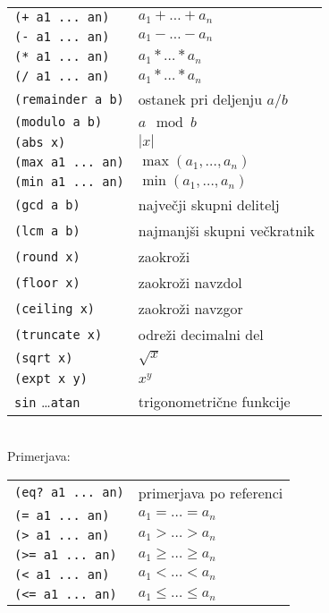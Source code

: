 \documentclass[a3paper,9pt]{extarticle}
\begin{document}
\begin{multicols}{4}
\begin{tabular}{@{}ll@{}}
    \lstinline|(+ a1 ... an)| & $a_1 + \dots + a_n$  \\
    \lstinline|(- a1 ... an)| & $a_1 - \dots - a_n$  \\
    \lstinline|(* a1 ... an)| & $a_1 * \dots * a_n$  \\
    \lstinline|(/ a1 ... an)| & $a_1 * \dots * a_n$  \\
    \lstinline|(remainder a b)| & ostanek pri deljenju $a/b$  \\
    \lstinline|(modulo a b)| & $a \mod b$  \\
    \lstinline|(abs x)| & $|x|$  \\
    \lstinline|(max a1 ... an)| & $\max(a_1, \dots, a_n)$  \\
    \lstinline|(min a1 ... an)| & $\min(a_1, \dots, a_n)$  \\
    \lstinline|(gcd a b)| & največji skupni delitelj  \\
    \lstinline|(lcm a b)| & najmanjši skupni večkratnik  \\
    \lstinline|(round x)| & zaokroži  \\
    \lstinline|(floor x)| & zaokroži navzdol  \\
    \lstinline|(ceiling x)| & zaokroži navzgor  \\
    \lstinline|(truncate x)| & odreži decimalni del  \\
    \lstinline|(sqrt x)| & $\sqrt{x}$  \\
    \lstinline|(expt x y)| & $x^y$  \\
    \lstinline|sin| \dots \lstinline|atan| & trigonometrične funkcije  \\
\end{tabular}\\

Primerjava:

\begin{tabular}{@{}ll@{}}
    \lstinline|(eq? a1 ... an)| & primerjava po referenci  \\
    \lstinline|(= a1 ... an)| & $a_1 = \dots = a_n$  \\
    \lstinline|(> a1 ... an)| & $a_1 > \dots > a_n$  \\
    \lstinline|(>= a1 ... an)| & $a_1 \geq \dots \geq a_n$  \\
    \lstinline|(< a1 ... an)| & $a_1 < \dots < a_n$  \\
    \lstinline|(<= a1 ... an)| & $a_1 \leq \dots \leq a_n$  \\
\end{tabular}\\


\end{multicols}
\end{document}
